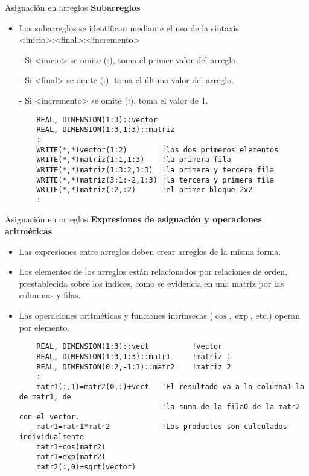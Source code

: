 \begin{frame}[fragile]{Asignación en arreglos}
 \textbf{Subarreglos}
  \begin{itemize}[<+(1)->]
  \item Los subarreglos se identifican mediante el uso de la sintaxis \\ 
   \centering <inicio>:<final>:<incremento>
  \item [-] Si <inicio> se omite (:), toma el primer valor del arreglo. 
  \item [-] Si <final> se omite (:), toma el último valor del arreglo.
  \item [-] Si <incremento> se omite (:), toma el valor de 1.
  \vspace{0.15cm}
  \item[]
  \begin{verbatim}
    REAL, DIMENSION(1:3)::vector
    REAL, DIMENSION(1:3,1:3)::matriz
    :
    WRITE(*,*)vector(1:2)        !los dos primeros elementos
    WRITE(*,*)matriz(1:1,1:3)    !la primera fila
    WRITE(*,*)matriz(1:3:2,1:3)  !la primera y tercera fila
    WRITE(*,*)matriz(3:1:-2,1:3) !la tercera y primera fila
    WRITE(*,*)matriz(:2,:2)      !el primer bloque 2x2
    :
  \end{verbatim}
 \end{itemize}
\end{frame}


\begin{frame}[fragile]{Asignación en arreglos}
 \textbf{Expresiones de asignación y operaciones aritméticas}
  \begin{itemize}[<+(1)->]
  \item Las expresiones entre arreglos  deben crear arreglos de la misma forma.
  \item Los elementos de los arreglos están relacionados por relaciones de orden, prestablecida sobre los índices, como se evidencia en una matriz por las columnas y filas.
  \item Las operaciones aritméticas y funciones intrínsecas ($\cos, \exp$, etc.) operan por elemento.
  \vspace{0.15 cm} 
  \item []
   \begin{verbatim}
    REAL, DIMENSION(1:3)::vect          !vector
    REAL, DIMENSION(1:3,1:3)::matr1     !matriz 1
    REAL, DIMENSION(0:2,-1:1)::matr2    !matriz 2
    :
    matr1(:,1)=matr2(0,:)+vect   !El resultado va a la columna1 la de matr1, de 
                                 !la suma de la fila0 de la matr2 con el vector.
    matr1=matr1*matr2            !Los productos son calculados individualmente
    matr1=cos(matr2)
    matr1=exp(matr2)
    matr2(:,0)=sqrt(vector)
   \end{verbatim}
 \end{itemize}
\end{frame}


